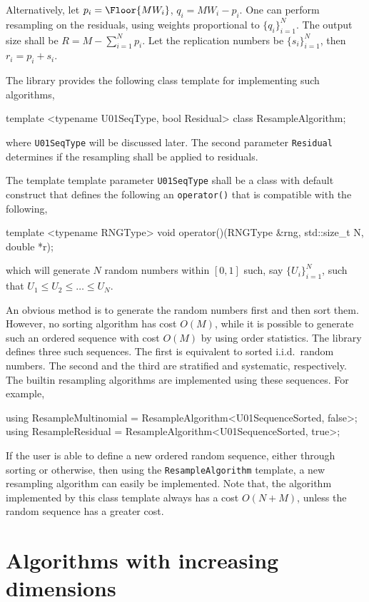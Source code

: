 Alternatively, let $p_i = \Floor{MW_i}$, $q_i = MW_i - p_i$. One can perform
resampling on the residuals, using weights proportional to $\{q_i\}_{i=1}^N$.
The output size shall be $R = M - \sum_{i=1}^N p_i$. Let the replication
numbers be $\{s_i\}_{i=1}^N$, then $r_i = p_i + s_i$.

The library provides the following class template for implementing such
algorithms,
\begin{cppcode}
  template <typename U01SeqType, bool Residual>
  class ResampleAlgorithm;
\end{cppcode}
where \verb|U01SeqType| will be discussed later. The second parameter
\verb|Residual| determines if the resampling shall be applied to residuals.

The template template parameter \verb|U01SeqType| shall be a class with default
construct that defines the following an \verb|operator()| that is compatible
with the following,
\begin{cppcode}
  template <typename RNGType>
  void operator()(RNGType &rng, std::size_t N, double *r);
\end{cppcode}
which will generate $N$ random numbers within $[0, 1]$ such, say
$\{U_i\}_{i=1}^N$, such that $U_1 \le U_2 \le \dots \le U_N$.

An obvious method is to generate the random numbers first and then sort them.
However, no sorting algorithm has cost $O(M)$, while it is possible to generate
such an ordered sequence with cost $O(M)$ by using order statistics. The
library defines three such sequences. The first is equivalent to sorted i.i.d.\
random numbers. The second and the third are stratified and systematic,
respectively. The builtin resampling algorithms are implemented using these
sequences. For example,
\begin{cppcode}
  using ResampleMultinomial = ResampleAlgorithm<U01SequenceSorted, false>;
  using ResampleResidual = ResampleAlgorithm<U01SequenceSorted, true>;
\end{cppcode}
If the user is able to define a new ordered random sequence, either through
sorting or otherwise, then using the \verb|ResampleAlgorithm| template, a new
resampling algorithm can easily be implemented. Note that, the algorithm
implemented by this class template always has a cost $O(N + M)$, unless the
random sequence has a greater cost.

\section{Algorithms with increasing dimensions}
\label{sec:Algorithms with increasing dimensions}

